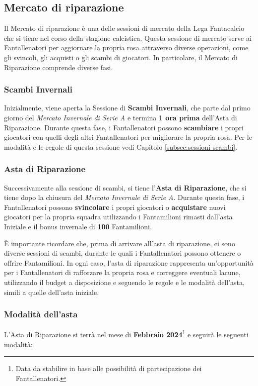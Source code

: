 \documentclass[12pt]{article}
\begin{document}
\subsection{Mercato di riparazione}
Il Mercato di riparazione è una delle sessioni di mercato della Lega Fantacalcio che si tiene nel corso della stagione calcistica. Questa sessione di mercato serve ai Fantallenatori per aggiornare la propria rosa attraverso diverse operazioni, come gli svincoli, gli acquisti o gli scambi di giocatori. 
In particolare, il Mercato di Riparazione comprende diverse fasi. 

\subsubsection{Scambi Invernali}
Inizialmente, viene aperta la Sessione di \textbf{Scambi Invernali}, che parte dal primo giorno del \textit{Mercato Invernale di Serie A} e termina \textbf{1 ora prima} dell'Asta di Riparazione. Durante questa fase, i Fantallenatori possono \textbf{scambiare} i propri giocatori con quelli degli altri Fantallenatori per migliorare la propria rosa. Per le modalità e le regole di questa sessione vedi Capitolo \ref{subsec:sessioni-scambi}.

\subsubsection{Asta di Riparazione}
Successivamente alla sessione di scambi, si tiene l'\textbf{Asta di Riparazione}, che si tiene dopo la chiusura del \textit{Mercato Invernale di Serie A}. Durante questa fase, i Fantallenatori possono \textbf{svincolare} i propri giocatori o \textbf{acquistare} nuovi giocatori per la propria squadra utilizzando i Fantamilioni rimasti dall'asta Iniziale e il bonus invernale di \textbf{100} Fantamilioni. 

È importante ricordare che, prima di arrivare all'asta di riparazione, ci sono diverse sessioni di scambi, durante le quali i Fantallenatori possono ottenere o offrire Fantamilioni. In ogni caso, l'asta di riparazione rappresenta un'opportunità per i Fantallenatori di rafforzare la propria rosa e correggere eventuali lacune, utilizzando il budget a disposizione e seguendo le regole e le modalità dell'asta, simili a quelle dell'asta iniziale.
\subsubsection*{Modalità dell'asta}
L'Asta di Riparazione si terrà nel mese di \textbf{Febbraio 2024}\footnote{Data da stabilire in base alle possibilità di partecipazione dei Fantallenatori.} e seguirà le seguenti modalità:
\end{document}
